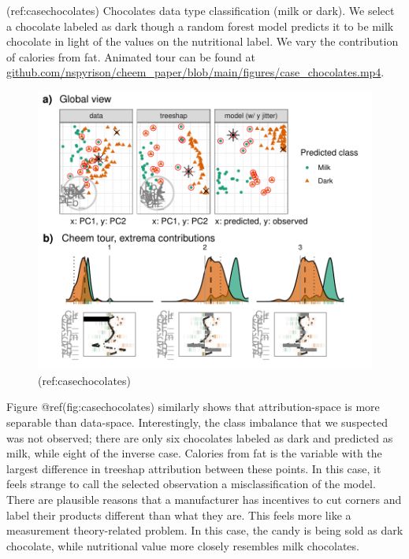 \documentclass[
]{article}
\begin{document}
(ref:casechocolates) Chocolates data type classification (milk or dark).
We select a chocolate labeled as dark though a random forest model
predicts it to be milk chocolate in light of the values on the
nutritional label. We vary the contribution of calories from fat.
Animated tour can be found at
\href{https://github.com/nspyrison/cheem_paper/blob/main/figures/case_chocolates.mp4}{github.com/nspyrison/cheem\_paper/blob/main/figures/case\_chocolates.mp4}.

\begin{figure}

{\centering \includegraphics[width=1\linewidth]{./figures/case_chocolates} 

}

\caption{(ref:casechocolates)}\label{fig:casechocolates}
\end{figure}

Figure @ref(fig:casechocolates) similarly shows that attribution-space
is more separable than data-space. Interestingly, the class imbalance
that we suspected was not observed; there are only six chocolates
labeled as dark and predicted as milk, while eight of the inverse case.
Calories from fat is the variable with the largest difference in
treeshap attribution between these points. In this case, it feels
strange to call the selected observation a misclassification of the
model. There are plausible reasons that a manufacturer has incentives to
cut corners and label their products different than what they are. This
feels more like a measurement theory-related problem. In this case, the
candy is being sold as dark chocolate, while nutritional value more
closely resembles milk chocolates.
\end{document}
